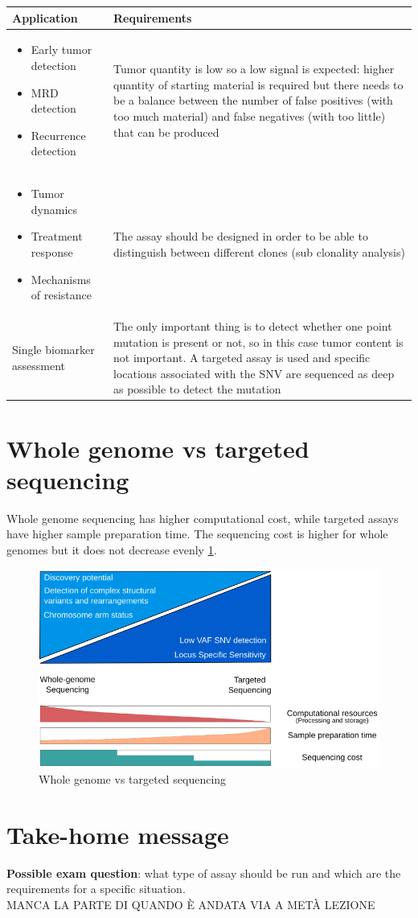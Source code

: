 \begin{tabular}{ | m{5cm}| m{9cm} | }
 \hline
 \textbf{Application} & \textbf{Requirements} \\
 \hline
 \begin{itemize}
     \item Early tumor detection
     \item MRD detection
     \item Recurrence detection
 \end{itemize} & Tumor quantity is low so a low signal is expected: higher quantity of starting material is required but there needs to be a balance between the number of false positives (with too much material) and false negatives (with too little) that can be produced \\
 \hline
 \begin{itemize}
     \item Tumor dynamics
     \item Treatment response
     \item Mechanisms of resistance
 \end{itemize} & The assay should be designed in order to be able to distinguish between different clones (sub clonality analysis) \\
 \hline
 Single biomarker assessment & The only important thing is to detect whether one point mutation is present or not, so in this case tumor content is not important. A targeted assay is used and specific locations associated with the SNV are sequenced as deep as possible to detect the mutation \\
 \hline
\end{tabular}

\section{Whole genome vs targeted sequencing}
Whole genome sequencing has higher computational cost, while targeted assays have higher sample preparation time. The sequencing cost is higher for whole genomes but it does not decrease evenly \ref{fig:wg}.

\begin{figure}[!ht]
\centering
    \includegraphics[width=0.7\linewidth]{wg.png}
    \caption{\label{fig:wg}Whole genome vs targeted sequencing}
\end{figure}


\section{Take-home message}
\textbf{Possible exam question}: what type of assay should be run and which are the requirements for a specific situation.\\

\centering
MANCA LA PARTE DI QUANDO È ANDATA VIA A METÀ LEZIONE
